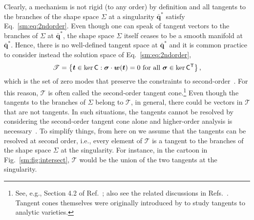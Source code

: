 Clearly, a mechanism is not rigid (to any order) by definition and all tangents to the branches of the shape space $\Sigma$ at a singularity $\bar{\bm{q}}^{*}$ satisfy Eq.~\eqref{sm:eq:2ndorder}.
Even though one can speak of tangent vectors to the branches of $\Sigma$ at $\bar{\bm{q}}^{*}$, the shape space $\Sigma$ itself ceases to be a smooth manifold at $\bar{\bm{q}}^{*}$.
Hence, there is no well-defined tangent space at $\bar{\bm{q}}^{*}$ and it is common practice to consider instead the solution space of Eq.~\eqref{sm:eq:2ndorder},
%
\begin{equation}
  \mathscr{T} = \left\{\bm{t} \in \ker\mathsf{C} : \bm{\sigma}\cdot \bm{w}(\bm{t}) = 0 \text{ for all } \bm{\sigma} \in \ker\mathsf{C}^\mathsf{T} \right\},
  \label{sm:eq:tangentcone}
\end{equation}
%
which is the set of zero modes that preserve the constraints to second-order~\cite{chen2018}.
For this reason, $\mathscr{T}$ is often called the second-order tangent cone.\footnote{See, e.g., Section 4.2 of Ref.~\cite{wu2020}; also see the related discussions in Refs.~\cite{muller2017,muller2019,lopez-custodio2020}.
Tangent cones themselves were originally introduced by \citet{whitney1965} to study tangents to analytic varieties.}
Even though the tangents to the branches of $\Sigma$ belong to $\mathscr{T}$, in general, there could be vectors in $\mathscr{T}$ that are not tangents.
In such situations, the tangents cannot be resolved by considering the second-order tangent cone alone and higher-order analysis is necessary~\cite{muller2017,lopez-custodio2020}.
To simplify things, from here on we assume that the tangents can be resolved at second order, i.e., every element of $\mathscr{T}$ is a tangent to the branches of the shape space $\Sigma$ at the singularity.
For instance, in the cartoon in Fig.~\ref{sm:fig:intersect}, $\mathscr{T}$ would be the union of the two tangents at the singularity.

